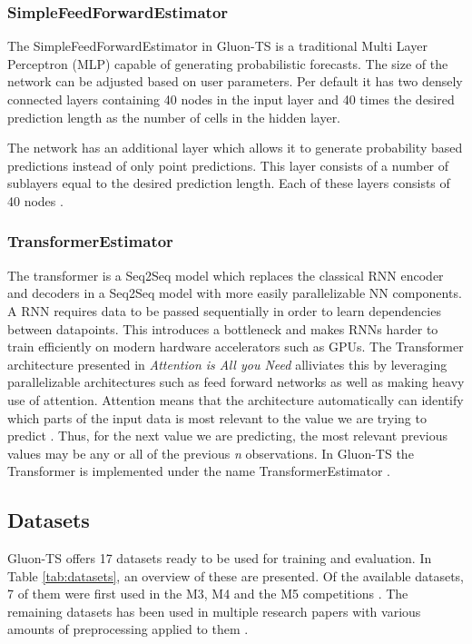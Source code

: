 \subsubsection{SimpleFeedForwardEstimator}
\label{algo:simplefeedforward}
The SimpleFeedForwardEstimator in Gluon-TS is a traditional Multi Layer Perceptron (MLP) capable of generating probabilistic forecasts. The size of the network can be adjusted based on user parameters. Per default it has two densely connected layers containing 40 nodes in the input layer and 40 times the desired prediction length as the number of cells in the hidden layer.

The network has an additional layer which allows it to generate probability based predictions instead of only point predictions. This layer consists of a number of sublayers equal to the desired prediction length. Each of these layers consists of 40 nodes \cite{gluonts-github}.

\subsubsection{TransformerEstimator}
The transformer is a Seq2Seq model which replaces the classical RNN encoder and decoders in a Seq2Seq model with more easily parallelizable NN components. A RNN requires data to be passed sequentially in order to learn dependencies between datapoints. This introduces a bottleneck and makes RNNs harder to train efficiently on modern hardware accelerators such as GPUs. The Transformer architecture presented in \textit{Attention is All you Need} \cite{vaswani_attention_nodate} alliviates this by leveraging parallelizable architectures such as feed forward networks as well as making heavy use of attention. Attention means that the architecture automatically can identify which parts of the input data is most relevant to the value we are trying to predict \cite{vaswani_attention_nodate}. Thus, for the next value we are predicting, the most relevant previous values may be any or all of the previous \textit{n} observations. In Gluon-TS the Transformer is implemented under the name TransformerEstimator \cite{gluonts-website}.

\subsection{Datasets}
Gluon-TS offers 17 datasets ready to be used for training and evaluation. In Table \ref{tab:datasets}, an overview of these are presented. Of the available datasets, 7 of them were first used in the M3, M4 and the M5 competitions \cite{makridakis_m4_2020,m3_competition,m5}. The remaining datasets has been used in multiple research papers with various amounts of preprocessing applied to them \cite{oreshkin_n_beats_2020,lai_modeling_2018,rangapuram_deep_2018,wen_multi-horizon_2018,wang_deep_2019,seq2seq}.

